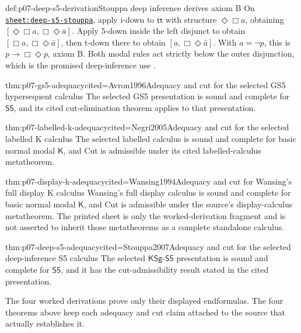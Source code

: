 \begin{hbexample}{def:p07-deep-s5-derivation}{Stouppa deep inference derives axiom B}
On \hyperref[sheet:deep-s5-stouppa]{\texttt{sheet:deep-s5-stouppa}}, apply
i-down to \(\mathsf{tt}\) with structure \(\Diamond\Box a\), obtaining
\([\Diamond\Box a,\Box\Diamond\bar a]\). Apply 5-down inside the left
disjunct to obtain \([\Box a,\Box\Diamond\bar a]\), then t-down there to obtain
\([a,\Box\Diamond\bar a]\). With \(a=\neg p\), this is
\(p\to\Box\Diamond p\), axiom B. Both modal rules act strictly below the outer
disjunction, which is the promised deep-inference use \cite{Stouppa2007}.
\end{hbexample}

\begin{hbtheorem}{thm:p07-gs5-adequacy}{cited=Avron1996}{Adequacy and cut for the selected GS5 hypersequent calculus}
The selected GS5 presentation is sound and complete for \(\mathsf{S5}\), and
its cited cut-elimination theorem applies to that presentation.
\end{hbtheorem}

\begin{hbtheorem}{thm:p07-labelled-k-adequacy}{cited=Negri2005}{Adequacy and cut for the selected labelled K calculus}
The selected labelled calculus is sound and complete for basic normal modal
\(\mathsf K\), and Cut is admissible under its cited labelled-calculus
metatheorem.
\end{hbtheorem}

\begin{hbtheorem}{thm:p07-display-k-adequacy}{cited=Wansing1994}{Adequacy and cut for Wansing's full display K calculus}
Wansing's full display calculus is sound and complete for basic normal modal
\(\mathsf K\), and Cut is admissible under the source's display-calculus
metatheorem.  The printed sheet is only the worked-derivation fragment and is
not asserted to inherit those metatheorems as a complete standalone calculus.
\end{hbtheorem}

\begin{hbtheorem}{thm:p07-deep-s5-adequacy}{cited=Stouppa2007}{Adequacy and cut for the selected deep-inference S5 calculus}
The selected \(\mathsf{KSg\mbox{-}S5}\) presentation is sound and complete for
\(\mathsf{S5}\), and it has the cut-admissibility result stated in the cited
presentation.
\end{hbtheorem}

The four worked derivations prove only their displayed endformulas.  The four
theorems above keep each adequacy and cut claim attached to the source that
actually establishes it.

